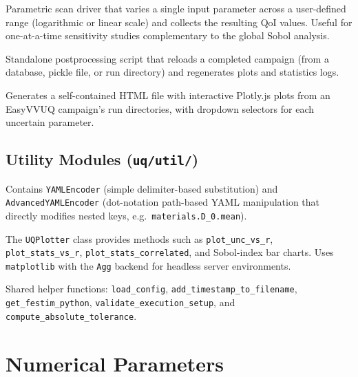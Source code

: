 \documentclass[11pt,a4paper]{article}
\begin{document}
\begin{description}[style=nextline]
  \item[\texttt{festim\_model\_scan.py}]
    Parametric scan driver that varies a single input parameter across a
    user-defined range (logarithmic or linear scale) and collects the
    resulting QoI values.  Useful for one-at-a-time sensitivity studies
    complementary to the global Sobol analysis.

  \item[\texttt{uq\_postprocessing.py}]
    Standalone postprocessing script that reloads a completed campaign
    (from a database, pickle file, or run directory) and regenerates plots
    and statistics logs.

  \item[\texttt{interactive\_run\_viewer.py}]
    Generates a self-contained HTML file with interactive Plotly.js plots
    from an EasyVVUQ campaign's run directories, with dropdown selectors
    for each uncertain parameter.
\end{description}


\subsection{Utility Modules (\texttt{uq/util/})}

\begin{description}[style=nextline]
  \item[\texttt{Encoder.py}]
    Contains \texttt{YAMLEncoder} (simple delimiter-based substitution) and
    \texttt{AdvancedYAMLEncoder} (dot-notation path-based YAML manipulation
    that directly modifies nested keys, e.g.\
    \texttt{materials.D\_0.mean}).

  \item[\texttt{plotting.py}]
    The \texttt{UQPlotter} class provides methods such as
    \texttt{plot\_unc\_vs\_r}, \texttt{plot\_stats\_vs\_r},
    \texttt{plot\_stats\_correlated}, and Sobol-index bar charts.
    Uses \texttt{matplotlib} with the \texttt{Agg} backend for headless
    server environments.

  \item[\texttt{utils.py}]
    Shared helper functions: \texttt{load\_config},
    \texttt{add\_timestamp\_to\_filename},
    \texttt{get\_festim\_python}, \texttt{validate\_execution\_setup},
    and \texttt{compute\_absolute\_tolerance}.
\end{description}


\section{Numerical Parameters}
\label{sec:parameters}
\end{document}
